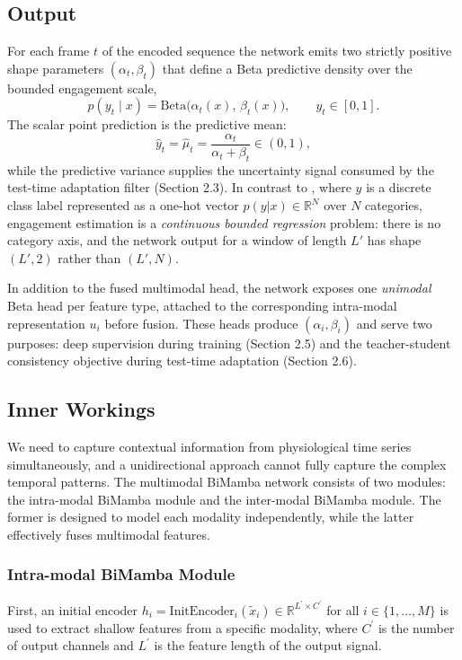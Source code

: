 \documentclass[11pt,a4paper]{article}
\newcommand{\R}{\mathbb{R}}
\begin{document}
	\subsection{Output}
	For each frame $t$ of the encoded sequence the network emits two strictly positive shape parameters $(\alpha_t, \beta_t)$ that define a Beta predictive density over the bounded engagement scale,
	$$p(y_t \mid x) = \mathrm{Beta}\bigl(\alpha_t(x),\,\beta_t(x)\bigr), \qquad y_t \in [0,1].$$
	The scalar point prediction is the predictive mean:
	$$\hat{y}_t = \hat{\mu}_t = \frac{\alpha_t}{\alpha_t + \beta_t} \in (0,1),$$
	while the predictive variance supplies the uncertainty signal consumed by the test-time adaptation filter (Section 2.3). In contrast to \cite{ziyu2025}, where $y$ is a discrete class label represented as a one-hot vector $p(y|x)\in\R^{N}$ over $N$ categories, engagement estimation is a \emph{continuous bounded regression} problem: there is no category axis, and the network output for a window of length $L'$ has shape $(L', 2)$ rather than $(L', N)$.
	
	In addition to the fused multimodal head, the network exposes one \emph{unimodal} Beta head per feature type, attached to the corresponding intra-modal representation $u_i$ before fusion. These heads produce $(\alpha_i, \beta_i)$ and serve two purposes: deep supervision during training (Section 2.5) and the teacher-student consistency objective during test-time adaptation (Section 2.6).
	
	\subsection{Inner Workings}
	We need to capture contextual information from physiological time series simultaneously, and a unidirectional approach cannot fully capture the complex temporal patterns. The multimodal BiMamba network consists of two modules: the intra-modal BiMamba module and the inter-modal BiMamba module. The former is designed to model each modality independently, while the latter effectively fuses multimodal features.
	
	\subsubsection{Intra-modal BiMamba Module}
	First, an initial encoder $h_{i} = \text{InitEncoder}_{i}(\tilde{x}_{i}) \in \R^{L^{\prime}\times C^{\prime}}$ for all $i\in\{1,\dots,M\}$ is used to extract shallow features from a specific modality, where $C^{\prime}$ is the number of output channels and $L^{\prime}$ is the feature length of the output signal.
	
\end{document}
